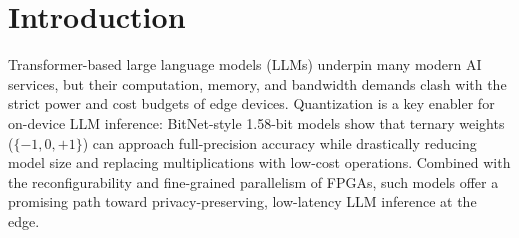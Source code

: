 \documentclass[9pt,sigconf]{acmart}
\begin{document}

    

\section{Introduction}

Transformer-based large language models (LLMs) underpin many modern AI services, but their computation, memory, and bandwidth demands clash with the strict power and cost budgets of edge devices. Quantization is a key enabler for on-device LLM inference: BitNet-style 1.58-bit models show that ternary weights ($\{-1,0,+1\}$) can approach full-precision accuracy while drastically reducing model size and replacing multiplications with low-cost operations. Combined with the reconfigurability and fine-grained parallelism of FPGAs, such models offer a promising path toward privacy-preserving, low-latency LLM inference at the edge.
\end{document}
